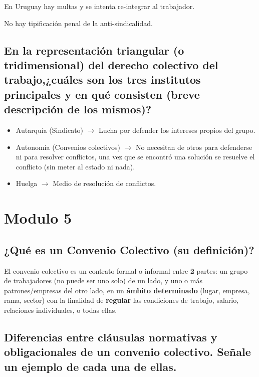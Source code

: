 \documentclass[spanish,12pt,a4paper,titlepage]{report}
\begin{document}
En Uruguay hay multas y se intenta re-integrar al trabajador.

No hay tipificación penal de la anti-sindicalidad.

\subsection{En la representación triangular (o tridimensional) del derecho colectivo del trabajo,¿cuáles son los tres institutos principales y en qué consisten (breve descripción de los mismos)?}

\begin{itemize}
\item Autarquía (Sindicato) $\rightarrow$ Lucha por defender los intereses propios del grupo.
\item Autonomía (Convenios colectivos) $\rightarrow$ No necesitan de otros para defenderse ni para resolver conflictos, una vez que se encontró una solución se resuelve el conflicto (sin meter al estado ni nada).
\item Huelga $\rightarrow$ Medio de resolución de conflictos.
\end{itemize}

\section{Modulo 5}

\subsection{¿Qué es un Convenio Colectivo (su definición)?}

El convenio colectivo es un contrato formal o informal entre \textbf{2} partes: un grupo de trabajadores (no puede ser uno solo) de un lado, y uno o más patrones/empresas del otro lado, en un \textbf{ámbito determinado} (lugar, empresa, rama, sector) con la finalidad de \textbf{regular} las condiciones de trabajo, salario, relaciones individuales, o todas ellas.

\subsection{Diferencias entre cláusulas normativas y obligacionales de un convenio colectivo. Señale un ejemplo de cada una de ellas.}
\end{document}
